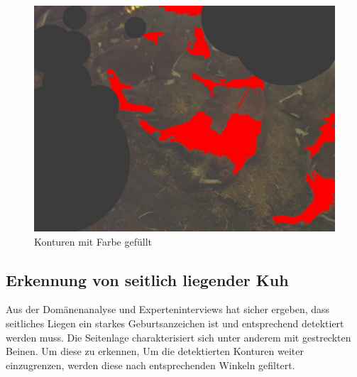 \begin{figure}[H]
	\center
	\includegraphics[scale=0.43]{Grafiken/entwicklung/14AfterThresholdingContourFilled.jpg}
	\caption{Konturen mit Farbe gefüllt} 
	\label{fig: Konturen mit Farbe gefüllt} 
\end{figure}


\subsection{Erkennung von seitlich liegender Kuh}
Aus der Domänenanalyse und Experteninterviews hat sicher ergeben, dass seitliches Liegen ein starkes Geburtsanzeichen ist und entsprechend detektiert werden muss. Die Seitenlage charakterisiert sich unter anderem mit gestreckten Beinen. Um diese zu erkennen, 
Um die detektierten Konturen weiter einzugrenzen, werden diese nach entsprechenden Winkeln gefiltert. 

